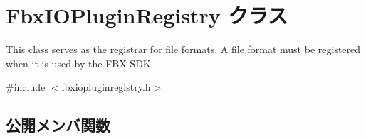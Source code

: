 \hypertarget{class_fbx_i_o_plugin_registry}{}\section{Fbx\+I\+O\+Plugin\+Registry クラス}
\label{class_fbx_i_o_plugin_registry}


This class serves as the registrar for file formats. A file format must be registered when it is used by the F\+BX S\+DK.  




{\ttfamily \#include $<$fbxiopluginregistry.\+h$>$}

\subsection*{公開メンバ関数}
